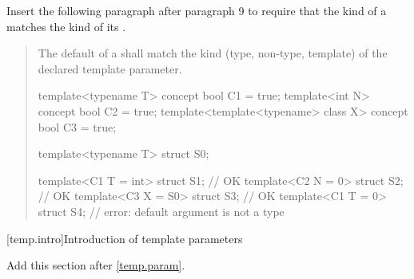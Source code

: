 Insert the following paragraph after paragraph 9 to require that the
kind of a  matches the kind of its
.

\begin{quote}
\begin{addedblock}
\setcounter{Paras}{11}
\pnum
The default  of
a  shall match
the kind (type, non-type, template) of the declared template parameter.
% 
\enterexample
\begin{codeblock}
template<typename T> concept bool C1 = true;
template<int N> concept bool C2 = true;
template<template<typename> class X> concept bool C3 = true;

template<typename T> struct S0;

template<C1 T = int> struct S1; // OK
template<C2 N = 0> struct S2;   // OK
template<C3 X = S0> struct S3;  // OK
template<C1 T = 0> struct S4;   // error: default argument is not a type
\end{codeblock}
\exitexample
\end{addedblock}
\end{quote}


[temp.intro]{Introduction of template parameters}

Add this section after \ref{temp.param}.

